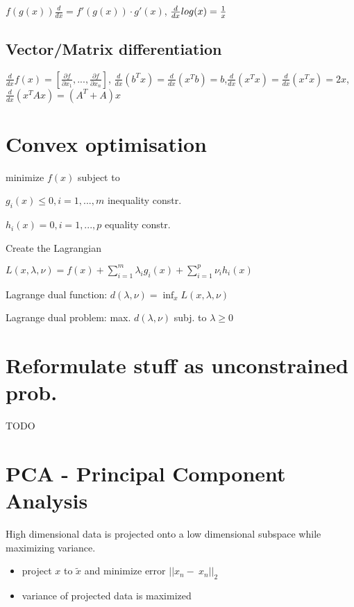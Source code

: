 \documentclass[11pt,twocolumn]{article}
\begin{document}
$ f(g(x)) \frac{d}{dx} = f'(g(x)) \cdot g'(x)$, $ {d \over {dx}} log(x) = {1 \over x}$

\subsection{Vector/Matrix differentiation}

$\frac{d}{dx} f(x) = \left[ \frac{\partial f }{\partial x_1} ,...,\frac{\partial f}{\partial x_n} \right]$, $\frac{d}{dx}(b^T x) = \frac{d}{dx} (x^T b) = b$,$\frac{d}{dx}(x^T x) = \frac{d}{dx} (x^T x) = 2x$,$\frac{d}{dx}(x^T A x) = (A^T + A) x$


\section{Convex optimisation}

minimize $f(x)$ subject to 

$g_i(x) \leq 0, i = 1,...,m$ inequality constr.

$h_i(x) = 0, i = 1,...,p$ equality constr.

Create the Lagrangian

$L(x, \lambda, \nu) = f(x) + \sum_{i=1}^m{\lambda_i g_i(x) + \sum_{i=1}^p{\nu_i h_i(x)}}$

Lagrange dual function: $ d(\lambda, \nu) = \inf_{x} L (x,\lambda, \nu) $

Lagrange dual problem: max. $d(\lambda, \nu)$  subj. to $\lambda \geq 0$


\section{Reformulate stuff as unconstrained prob.}

TODO


\maketitle



\section{PCA - Principal Component Analysis}

High dimensional data is projected onto a low dimensional subspace while maximizing variance.

\begin{itemize}
\item project $x$ to $\tilde{x}$ and minimize error $|| x_n - ~x_n ||_2$
\item variance of projected data is maximized
\end{itemize}
\end{document}
